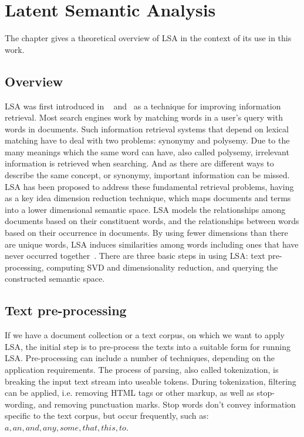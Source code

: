 \chapter{Latent Semantic Analysis}
\label{sec:lsa}

\begin{summary}
The chapter gives a theoretical overview of \gls{LSA} in the context of its use in this work.
\end{summary}
 
\section{Overview}
\label{sec:lsa:overview}

\gls{LSA} was first introduced in ~\cite{Dumais88usingLSA} and~\cite{Deerw90_LSA} as a technique for improving information retrieval. Most search engines work by matching words in a user's query with words in documents. Such information retrieval systems that depend on lexical matching have to deal with two problems: synonymy and polysemy. Due to the many meanings which the same word can have, also called polysemy, irrelevant information is retrieved when searching. And as there are different ways to describe the same concept, or synonymy, important information can be missed. \gls{LSA} has been proposed to address these fundamental retrieval problems, having as a key idea dimension reduction technique, which maps documents and terms into a lower dimensional semantic space. \gls{LSA} models the relationships among documents based on their constituent words, and the relationships between words based on their occurrence in documents. By using fewer dimensions than there are unique words, \gls{LSA} induces similarities among words including ones that have never occurred together~\cite{Dumais2006}. There are three basic steps in using \gls{LSA}: text pre-processing, computing \gls{SVD} and dimensionality reduction, and querying the constructed semantic space.\\
 
\section{Text pre-processing}
\label{sec:lsa:pre-processing}

If we have a document collection or a text corpus, on which we want to apply \gls{LSA}, the initial step is to pre-process the texts into a suitable form for running \gls{LSA}. Pre-processing can include a number of techniques, depending on the application requirements. The process of parsing, also called tokenization, is breaking the input text stream into useable tokens. During tokenization, filtering can be applied, i.e. removing HTML tags or other markup, as well as stop-wording, and removing punctuation marks. Stop words don't convey information specific to the text corpus, but occur frequently, such as: $ a, an, and, any, some, that, this, to $. \\

